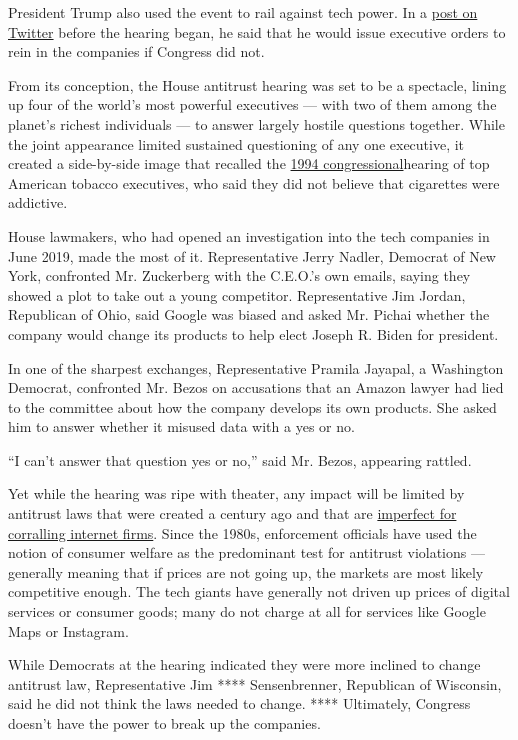 President Trump also used the event to rail against tech power. In a
\href{https://twitter.com/realDonaldTrump/status/1288506554585505793}{post
on Twitter} before the hearing began, he said that he would issue
executive orders to rein in the companies if Congress did not.

From its conception, the House antitrust hearing was set to be a
spectacle, lining up four of the world's most powerful executives ---
with two of them among the planet's richest individuals --- to answer
largely hostile questions together. While the joint appearance limited
sustained questioning of any one executive, it created a side-by-side
image that recalled the
\href{https://www.nytimes.com/1994/04/15/us/tobacco-chiefs-say-cigarettes-aren-t-addictive.html}{1994
congressional}hearing of top American tobacco executives, who said they
did not believe that cigarettes were addictive.

House lawmakers, who had opened an investigation into the tech companies
in June 2019, made the most of it. Representative Jerry Nadler, Democrat
of New York, confronted Mr. Zuckerberg with the C.E.O.'s own emails,
saying they showed a plot to take out a young competitor. Representative
Jim Jordan, Republican of Ohio, said Google was biased and asked Mr.
Pichai whether the company would change its products to help elect
Joseph R. Biden for president.

In one of the sharpest exchanges, Representative Pramila Jayapal, a
Washington Democrat, confronted Mr. Bezos on accusations that an Amazon
lawyer had lied to the committee about how the company develops its own
products. She asked him to answer whether it misused data with a yes or
no.

``I can't answer that question yes or no,'' said Mr. Bezos, appearing
rattled.

Yet while the hearing was ripe with theater, any impact will be limited
by antitrust laws that were created a century ago and that are
\href{https://www.nytimes.com/2018/09/07/technology/monopoly-antitrust-lina-khan-amazon.html}{imperfect
for corralling internet firms}. Since the 1980s, enforcement officials
have used the notion of consumer welfare as the predominant test for
antitrust violations --- generally meaning that if prices are not going
up, the markets are most likely competitive enough. The tech giants have
generally not driven up prices of digital services or consumer goods;
many do not charge at all for services like Google Maps or Instagram.

While Democrats at the hearing indicated they were more inclined to
change antitrust law, Representative Jim **** Sensenbrenner, Republican
of Wisconsin, said he did not think the laws needed to change. ****
Ultimately, Congress doesn't have the power to break up the companies.

